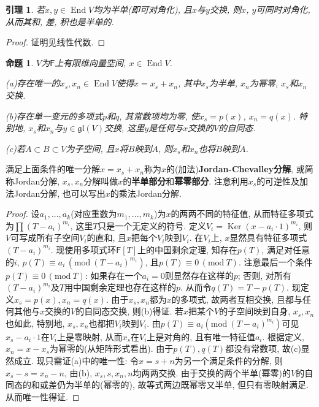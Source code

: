 \documentclass{ctexart}%
\newtheorem{lemma}{引理}
\newtheorem{proposition}{命题}
\theoremstyle{definition}
\theoremstyle{remark}
\DeclareMathOperator{\End}{End}
\DeclareMathOperator{\Ker}{Ker}
\newcommand{\Mod}[1]{\mathrm{mod}\ #1}
\begin{document}
\begin{lemma}
若$x,y\in \End V$均为半单(即可对角化), 且$x$与$y$交换, 则$x$, $y$可同时对角化, 从而其和, 差, 积也是半单的.
\end{lemma}
\begin{proof}
证明见线性代数.
\end{proof}

\begin{proposition}\label{4.2}
$V$为$\mathsf{F}$上有限维向量空间, $x\in \End V$.

(a)存在唯一的$x_s,x_n \in \End V$使得$x=x_s+x_n$, 其中$x_s$为半单, $x_n$为幂零, $x_s$和$x_n$交换.

(b)存在单一变元的多项式$p$和$q$, 其常数项均为零, 使$x_s=p(x)$, $x_n=q(x)$. 特别地, $x_s$和$x_n$与$y\in \mathfrak{gl}(V)$交换, 这里$y$是任何与$x$交换的$V$的自同态.

(c)若$A\subset B\subset V$为子空间, 且$x$将$B$映到$A$, 则$x_s$和$x_n$也将$B$映到$A$.
\end{proposition}
满足上面条件的唯一分解$x=x_s+x_n$称为$x$的(加法)\;\textbf{Jordan-Chevalley分解}, 或简称Jordan分解, $x_s,x_n$分解叫做$x$的\textbf{半单部分}和\textbf{幂零部分}. 注意利用$x_s$的可逆性及加法Jordan分解, 也可以写出$x$的乘法Jordan分解.
\begin{proof}
设$a_1,...,a_k$(对应重数为$m_1,...,m_k$)为$x$的两两不同的特征值, 从而特征多项式为$\prod(T-a_i)^{m_i}$, 这里$T$只是一个无定义的符号. 定义$V_i =  \Ker(x-a_i\cdot 1)^{m_i}$, 则$V$可写成所有子空间$V_i$的直和, 且$x$把每个$V_i$映到$V_i$. 在$V_i$上, $x$显然具有特征多项式$(T-a_i)^{m_i}$. 现使用多项式环$\mathsf{F}[T]$上的中国剩余定理, 知存在$p(T)$, 满足对任意的$i$, $p(T)\equiv a_i \,(\Mod (T-a_i)^{m_i})$, 且$p(T)\equiv 0\,(\Mod T)$. 注意最后一个条件$p(T)\equiv 0\,(\Mod T)$: 如果存在一个$a_i=0$则显然存在这样的$p$; 否则, 对所有$(T-a_i)^{m_i}$及$T$用中国剩余定理也存在这样的$p$. 从而令$q(T)=T-p(T)$. 现定义$x_s=p(x), x_n=q(x)$. 由于$x_s,x_n$都为$x$的多项式, 故两者互相交换, 且都与任何其他与$x$交换的$V$的自同态交换, 则(b)得证. 若$x$把某个$V$的子空间映到自身, $x_s,x_n$也如此, 特别地, $x_s, x_n$也都把$V_i$映到$V_i$. 由$p(T)\equiv a_i(\Mod (T-a_i)^{m_i})$可见$x_s-a_i\cdot 1$在$V_i$上是零映射, 从而$x_s$在$V_i$上是对角的, 且有唯一特征值$a_i$. 根据定义, $x_n=x-x_s$为幂零的(从矩阵形式看出). 由于$p(T),q(T)$都没有常数项, 故(c)显然成立. 现只需证(a)中的唯一性: 令$x=s+n$为另一个满足条件的分解, 则$x_s-s=x_n-n$, 由(b), $x_s,s,x_n,n$均两两交换. 由于交换的两个半单(幂零)的$V$的自同态的和或差仍为半单的(幂零的), 故等式两边既幂零又半单, 但只有零映射满足. 从而唯一性得证.
\end{proof}
\end{document}
